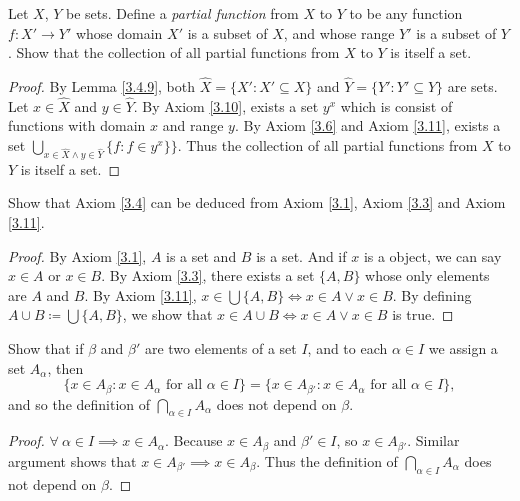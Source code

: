 \begin{exercise}\label{ex 3.4.7}
Let \(X\), \(Y\) be sets.
Define a \emph{partial function} from \(X\) to \(Y\) to be any function \(f : X' \to Y'\) whose domain \(X'\) is a subset of \(X\), and whose range \(Y'\) is a subset of \(Y\).
Show that the collection of all partial functions from \(X\) to \(Y\) is itself a set.
\end{exercise}

\begin{proof}
By Lemma \ref{3.4.9}, both \(\hat{X} = \{X' : X' \subseteq X\}\) and \(\hat{Y} = \{Y' : Y' \subseteq Y\}\) are sets.
Let \(x \in \hat{X}\) and \(y \in \hat{Y}\).
By Axiom \ref{3.10}, exists a set \(y^{x}\) which is consist of functions with domain \(x\) and range \(y\).
By Axiom \ref{3.6} and Axiom \ref{3.11}, exists a set \(\bigcup_{x \in \hat{X} \land y \in \hat{Y}} \{f : f \in y^{x}\}\}\).
Thus the collection of all partial functions from \(X\) to \(Y\) is itself a set.
\end{proof}

\begin{exercise}\label{ex 3.4.8}
Show that Axiom \ref{3.4} can be deduced from Axiom \ref{3.1}, Axiom \ref{3.3} and Axiom \ref{3.11}.
\end{exercise}

\begin{proof}
By Axiom \ref{3.1}, \(A\) is a set and \(B\) is a set.
And if \(x\) is a object, we can say \(x \in A\) or \(x \in B\).
By Axiom \ref{3.3}, there exists a set \(\{A, B\}\) whose only elements are \(A\) and \(B\).
By Axiom \ref{3.11}, \(x \in \bigcup \{A, B\} \iff x \in A \lor x \in B\).
By defining \(A \cup B \coloneqq \bigcup \{A, B\}\), we show that \(x \in A \cup B \iff x \in A \lor x \in B\) is true.
\end{proof}

\begin{exercise}\label{ex 3.4.9}
Show that if \(\beta\) and \(\beta'\) are two elements of a set \(I\), and to each \(\alpha \in I\) we assign a set \(A_{\alpha}\), then
\[
    \{x \in A_{\beta} : x \in A_{\alpha} \text{ for all } \alpha \in I\} = \{x \in A_{\beta'} : x \in A_{\alpha} \text{ for all } \alpha \in I\},
\]
and so the definition of \(\bigcap_{\alpha \in I} A_{\alpha}\) does not depend on \(\beta\).
\end{exercise}

\begin{proof}
\(\forall\ \alpha \in I \implies x \in A_{\alpha}\).
Because \(x \in A_{\beta}\) and \(\beta' \in I\), so \(x \in A_{\beta'}\).
Similar argument shows that \(x \in A_{\beta'} \implies x \in A_{\beta}\).
Thus the definition of \(\bigcap_{\alpha \in I} A_{\alpha}\) does not depend on \(\beta\).
\end{proof}


